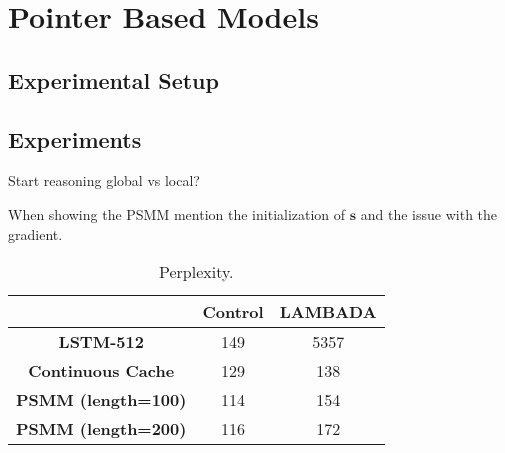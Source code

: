 \section{Pointer Based Models}
\label{sec:pointerExps}

\subsection{Experimental Setup}

\subsection{Experiments}

Start reasoning global vs local?

When showing the PSMM mention the initialization of $\mathbf{s}$ and the issue with the gradient.

\begin{table}[H]
	\centering
	\begin{tabular}{c|c|c|}
		\cline{2-3}
		\multicolumn{1}{l|}{}                            & \textbf{Control} & \textbf{LAMBADA} \\ \hline
		\multicolumn{1}{|c|}{\textbf{LSTM-512}}          & 149              & 5357             \\ \hline
		\multicolumn{1}{|c|}{\textbf{Continuous Cache}}               & 129              & 138              \\ \hline
		\multicolumn{1}{|c|}{\textbf{PSMM (length=100)}} & 114              & 154              \\ \hline
		\multicolumn{1}{|c|}{\textbf{PSMM (length=200)}} & 116              & 172              \\ \hline
	\end{tabular}
	\caption{Perplexity.}
	\label{psmmExps}
\end{table}

\begin{figure}[H]
	\centering
	\label{fig:gateEx2}
\end{figure}

\begin{figure}[H]
	\centering
	\label{fig:gateEx1}
\end{figure}

\begin{figure}[H]
	\centering
	\label{fig:gateEx3}
\end{figure}